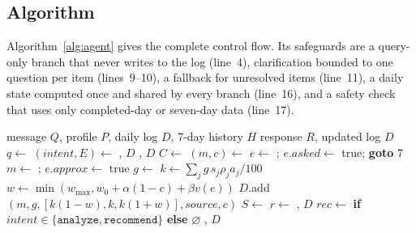 \documentclass[conference]{IEEEtran}
\begin{document}
\subsection{Algorithm}
Algorithm~\ref{alg:agent} gives the complete control flow. Its safeguards are a query-only branch that never writes to the log (line~4), clarification bounded to one question per item (lines~9--10), a fallback for unresolved items (line~11), a daily state computed once and shared by every branch (line~16), and a safety check that uses only completed-day or seven-day data (line~17).

\begin{algorithm}[t]
\caption{DietSense agent}
\label{alg:agent}
\footnotesize
\begin{algorithmic}[1]
\Require message $Q$, profile $P$, daily log $D$, 7-day history $H$
\Ensure response $R$, updated log $D$
\State $q\gets$ 
\State $(\mathit{intent},E)\gets$  
 \Return {}, $D$ \EndIf
{} \Return {}, $D$ \EndIf
{}
    \State $C\gets$ 
    \State $(m,c)\gets$ 
      \State $e\gets$ ; $e.\mathit{asked}\gets$ true; \textbf{goto} 7
    \EndIf
     $m\gets$ ; $e.\mathit{approx}\gets$ true \EndIf
    \State $g\gets$  
    \State $k\gets \sum_j g\,s_j \rho_j a_j/100$
    \State $w\gets\min(w_{\max},w_0+\alpha(1-c)+\beta v(e))$
    \State $D$.add$(m,g,[k(1-w),k,k(1+w)],\mathit{source},c)$
  \EndFor
\EndIf
\State $S\gets$  
\State $r\gets$  
 \Return {}, $D$ \EndIf
\State $\mathit{rec}\gets$  \textbf{if} $\mathit{intent}\in\{\texttt{analyze},\texttt{recommend}\}$ \textbf{else} $\varnothing$
\State \Return {}, $D$
\end{algorithmic}
\end{algorithm}
\end{document}
